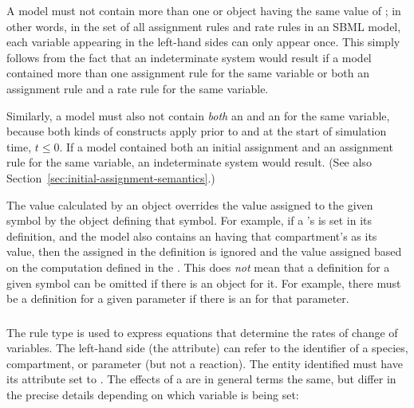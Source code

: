A model must not contain more than one \AssignmentRule or
\RateRule object having the same value of ; in
other words, in the set of all assignment rules and rate rules in
an SBML model, each variable appearing in the left-hand sides can
only appear once.  This simply follows from the fact that an
indeterminate system would result if a model contained more than
one assignment rule for the same variable or both an assignment
rule and a rate rule for the same variable.

Similarly, a model must also not contain \emph{both} an
\AssignmentRule and an \InitialAssignment for the same variable,
because both kinds of constructs apply prior to and at the start
of simulation time, \ie $t \leq 0$.  If a model contained both an
initial assignment and an assignment rule for the same variable,
an indeterminate system would result.  (See also
Section~\ref{sec:initial-assignment-semantics}.)

The value calculated by an \AssignmentRule object overrides the
value assigned to the given symbol by the object defining that
symbol.  For example, if a \Compartment's  is set in
its definition, and the model also contains an \AssignmentRule
having that compartment's  as its 
value, then the  assigned in the \Compartment
definition is ignored and the value assigned based on the
computation defined in the \AssignmentRule.  This does \emph{not}
mean that a definition for a given symbol can be omitted if there
is an \AssignmentRule object for it.  For example, there must be a
\Parameter definition for a given parameter if there is an
\AssignmentRule for that parameter.


\subsubsection{}
\label{sec:raterule}

The rule type \RateRule is used to express equations that
determine the rates of change of variables.  The left-hand side
(the  attribute) can refer to the identifier of a
species, compartment, or parameter (but not a reaction).  The
entity identified must have its  attribute set to
.  The effects of a \RateRule are in general terms the
same, but differ in the precise details depending on which
variable is being set:

